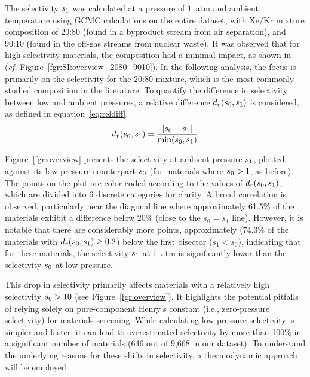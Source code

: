 \documentclass[main.tex]{subfiles}
\begin{document}
The selectivity $s_{\text{1}}$ was calculated at a pressure of $1$~atm and ambient temperature using GCMC calculations on the entire dataset, with Xe/Kr mixture composition of 20:80 (found in a byproduct stream from air separation\autocite{kerry2007industrial}), and 90:10 (found in the off-gas streams from nuclear waste\autocite{auerbach2003handbook}). It was observed that for high-selectivity materials, the composition had a minimal impact, as shown in (\emph{cf.} Figure~\ref{fgr:SI:overview_2080_9010}). In the following analysis, the focus is primarily on the selectivity for the 20:80 mixture, which is the most commonly studied composition in the literature. To quantify the difference in selectivity between low and ambient pressures, a relative difference $d_r(s_{\text{0}},s_{\text{1}})$ is considered, as defined in equation~\ref{eq:reldiff}.
\begin{equation}\label{eq:reldiff}
    d_r(s_{\text{0}},s_{\text{1}}) = \dfrac{\lvert s_{\text{0}} - s_{\text{1}} \rvert}{\min(s_{\text{0}},s_{\text{1}})}
\end{equation}

Figure~\ref{fgr:overview} presents the selectivity at ambient pressure $s_{\text{1}}$, plotted against its low-pressure counterpart $s_{\text{0}}$ (for materials where $s_{\text{0}} > 1$, as before). The points on the plot are color-coded according to the values of $d_r(s_{\text{0}},s_{\text{1}})$, which are divided into 6 discrete categories for clarity. A broad correlation is observed, particularly near the diagonal line where approximately {61.5\%} of the materials exhibit a difference below {20\%} (close to the $s_0 = s_1$ line). 
However, it is notable that there are considerably more points, approximately ({74.3\%} of the materials with $d_r(s_{\text{0}},s_{\text{1}})\ge 0.2$) below the first bisector ($s_1 < s_0$), indicating that for these materials, the selectivity $s_{\text{1}}$ at 1~atm is significantly lower than the selectivity $s_{\text{0}}$ at low pressure.

This drop in selectivity primarily affects materials with a relatively high selectivity $s_{\text{0}} > 10$ (see Figure~\ref{fgr:overview}). It highlights the potential pitfalls of relying solely on pure-component Henry's constant (i.e., zero-pressure selectivity) for materials screening. While calculating low-pressure selectivity is simpler and faster, it can lead to overestimated selectivity by more than {100\%} in a significant number of materials (646 out of 9,668 in our dataset). To understand the underlying reasons for these shifts in selectivity, a thermodynamic approach will be employed.
\end{document}
